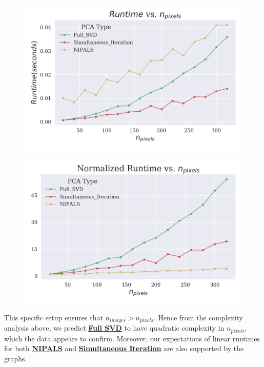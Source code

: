 \documentclass[12pt]{article}
\begin{document}
\begin{figure}[H]
\centering
\begin{minipage}{.45\textwidth}
  \centering
  \includegraphics[width=\linewidth]{U_Pixels.png}
  \label{UPixels}
\end{minipage}%
\quad
\begin{minipage}{.45\textwidth}
  \centering
  \includegraphics[width=\linewidth]{N_Pixels.png}
  \label{NPixels}
\end{minipage}
\end{figure}

This specific setup ensures that $n_{images} > n_{pixels}$. Hence from the complexity analysis above, we predict \textbf{\hyperref[3.2]{Full SVD}} to have quadratic complexity in $n_{pixels}$, which the data appears to confirm. Moreover, our expectations of linear runtimes for both \textbf{\hyperref[3.1]{NIPALS}} and \textbf{\hyperref[3.3]{Simultaneous Iteration}} are also supported by the graphs. 
\end{document}
